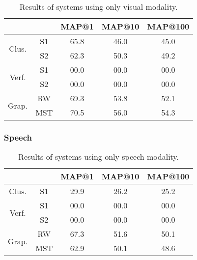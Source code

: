 \begin{table}[tb]
\centering
\begin{tabular}{|c|c|c|c|c|}
\cline{3-5}
 \multicolumn{2}{c|}{ }	& MAP@1  & MAP@10 & MAP@100  \\ \hline
 \multirow{2}{*}{Clus.} & S1	& 65.8   & 46.0   & 45.0 \\ \cline{2-5}
 						& S2  	& 62.3   & 50.3   & 49.2 \\ \hline

 \multirow{2}{*}{Verf.} & S1	& 00.0   & 00.0   & 00.0 \\ \cline{2-5}
 						& S2 	& 00.0   & 00.0   & 00.0 \\ \hline

 \multirow{2}{*}{Grap.} & RW 	& 69.3   & 53.8   & 52.1 \\ \cline{2-5}
 						& MST 	& 70.5   & 56.0   & 54.3 \\ \hline 										
\end{tabular}
\vspace*{-2mm}
\caption{Results of systems using only visual modality.}
\vspace*{-2mm}
\label{tab:face_result}
\end{table}

\subsubsection{Speech}

\begin{table}[tb]
\centering
\begin{tabular}{|c|c|c|c|c|}
\cline{3-5}
 \multicolumn{2}{c|}{ }	& MAP@1  & MAP@10 & MAP@100  \\ \hline
 \multirow{1}{*}{Clus.} & S1	& 29.9   & 26.2   & 25.2 \\ \cline{1-5}

 \multirow{2}{*}{Verf.} & S1	& 00.0   & 00.0   & 00.0 \\ \cline{2-5}
 						& S2 	& 00.0   & 00.0   & 00.0 \\ \hline

 \multirow{2}{*}{Grap.} & RW 	& 67.3 	 &  51.6  & 50.1 \\ \cline{2-5}
 						& MST 	& 62.9   &  50.1  & 48.6 \\ \hline 								
\end{tabular}
\vspace*{-2mm}
\caption{Results of systems using only speech modality.}
\vspace*{-2mm}
\label{tab:speech_result}
\end{table}


